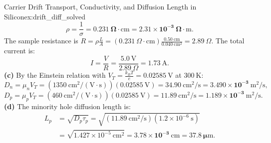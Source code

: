 \documentclass[11pt,a4paper]{article}
\begin{document}
\begin{examplebox}{Carrier Drift Transport, Conductivity, and Diffusion Length in Silicon}{ex:drift_diff_solved}
\[
    \rho = \frac{1}{\sigma} = \mathbf{0.231\ \Omega\cdot\mathrm{cm} = 2.31\times 10^{-3}\ \Omega\cdot\mathrm{m}}.
\]
The sample resistance is $R = \rho \frac{L}{A} = (0.231\ \Omega\cdot\mathrm{cm})\frac{0.50\ \mathrm{cm}}{0.040\ \mathrm{cm^2}} = 2.89\ \Omega$. The total current is:
\[
    I = \frac{V}{R} = \frac{5.0\ \mathrm{V}}{2.89\ \Omega} = \mathbf{1.73\ \mathrm{A}}.
\]
\textbf{(c)} By the Einstein relation with $V_T = \frac{k_B T}{e} = 0.02585\ \mathrm{V}$ at $300\ \mathrm{K}$:
\[
    D_n = \mu_n V_T = (1350\ \mathrm{cm^2/(V\cdot s)})(0.02585\ \mathrm{V}) = \mathbf{34.90\ \mathrm{cm^2/s} = 3.490\times 10^{-3}\ \mathrm{m^2/s}},
\]
\[
    D_p = \mu_p V_T = (460\ \mathrm{cm^2/(V\cdot s)})(0.02585\ \mathrm{V}) = \mathbf{11.89\ \mathrm{cm^2/s} = 1.189\times 10^{-3}\ \mathrm{m^2/s}}.
\]
\textbf{(d)} The minority hole diffusion length is:
\begin{align*}
    L_p &= \sqrt{D_p \tau_p} = \sqrt{(11.89\ \mathrm{cm^2/s})(1.2\times 10^{-6}\ \mathrm{s})} \\
        &= \sqrt{1.427\times 10^{-5}\ \mathrm{cm^2}} = \mathbf{3.78\times 10^{-3}\ \mathrm{cm} = 37.8\ \mu\mathrm{m}}.
\end{align*}
\end{examplebox}
\end{document}
